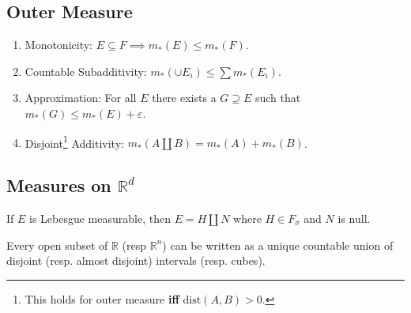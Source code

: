 \hypertarget{outer-measure}{%
\subsection{Outer Measure}\label{outer-measure}}

\begin{proposition}

\envlist

\begin{enumerate}
\def\labelenumi{\arabic{enumi}.}
\tightlist
\item
  Monotonicity: \(E\subseteq F \implies m_*(E) \leq m_*(F)\).
\item
  Countable Subadditivity: \(m_*(\cup E_{i}) \leq \sum m_*(E_{i})\).
\item
  Approximation: For all \(E\) there exists a \(G \supseteq E\) such
  that \(m_*(G) \leq m_*(E) + \varepsilon\).
\item
  Disjoint\footnote{This holds for outer measure \textbf{iff}
    \(\mathrm{dist}(A, B) > 0\).} Additivity:
  \(m_*(A {\textstyle\coprod}B) = m_*(A) + m_*(B)\).
\end{enumerate}

\end{proposition}

\hypertarget{measures-on-mathbbrd}{%
\subsection{\texorpdfstring{Measures on
\({\mathbb{R}}^d\)}{Measures on \{\textbackslash mathbb\{R\}\}\^{}d}}\label{measures-on-mathbbrd}}

\begin{proposition}

If \(E\) is Lebesgue measurable, then \(E = H {\textstyle\coprod}N\)
where \(H \in F_\sigma\) and \(N\) is null.

\end{proposition}

\begin{proposition}

Every open subset of \({\mathbb{R}}\) (resp \({\mathbb{R}}^n\)) can be
written as a unique countable union of disjoint (resp. almost disjoint)
intervals (resp. cubes).

\end{proposition}

